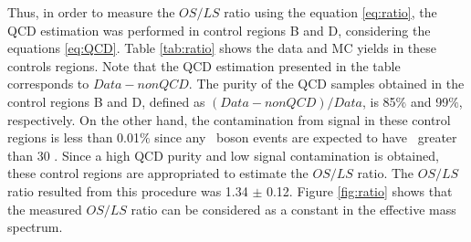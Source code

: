 \noindent Thus, in order to measure the $OS/LS$ ratio using the equation \ref{eq:ratio},
the QCD estimation was performed in control regions B and D,
considering the equations \ref{eq:QCD}. Table \ref{tab:ratio} shows the data 
and MC yields in these controls regions. Note that the QCD estimation  presented 
in the table corresponds to $Data-nonQCD$. The purity of the QCD samples obtained
in the control regions B and D, defined as $(Data-nonQCD)/Data$, 
is 85$\%$ and 99$\%$, respectively. On the other hand, the contamination
from signal in these control regions is less than 0.01$\%$ since any \Zprime~boson events
are expected to have \MET~greater than 30 \GeV. Since a high QCD purity and low 
signal contamination is obtained, these control regions are appropriated
to estimate the $OS/LS$ ratio. The $OS/LS$ ratio resulted from this procedure 
was 1.34 $\pm$ 0.12. Figure \ref{fig:ratio} shows that the measured $OS/LS$ ratio 
can be considered as a constant in the effective mass spectrum.\\

\begin{tiny} 
 \begin{table}[ht] 
   \caption{Yields in the controls region B and D used for calculation of $R_{OSLS}$ ratio.}
  \label{tab:ratio}
 \end{table} 
 \end{tiny}

